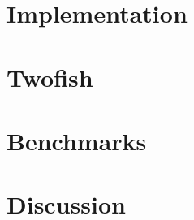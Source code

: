 \documentclass[a4paper,10pt,openright]{memoir}
\begin{document}
\chapter{Implementation}

%
%

\chapter{Twofish}
\label{chapt - Twofish}



\chapter{Benchmarks}
\label{chapt - Benchmarks}


\chapter{Discussion}
\label{chapt - Discussion}
%


\label{chapt - Conclusion}







\newpage

\renewcommand\bibname{References}


\end{document}
